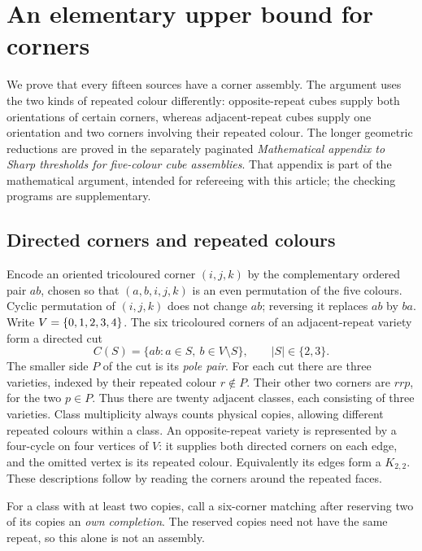 \section{An elementary upper bound for corners}\label{sec:elementary}
We prove that every fifteen sources have a corner assembly. The argument
uses the two kinds of repeated colour differently: opposite-repeat cubes
supply both orientations of certain corners, whereas adjacent-repeat cubes
supply one orientation and two corners involving their repeated colour.
The longer geometric reductions are proved in the separately paginated
\emph{Mathematical appendix to Sharp thresholds for five-colour cube
assemblies}. That appendix is part of the mathematical argument, intended
for refereeing with this article; the checking programs are supplementary.

\subsection{Directed corners and repeated colours}
Encode an oriented tricoloured corner $(i,j,k)$ by the complementary ordered
pair $ab$, chosen so that $(a,b,i,j,k)$ is an even permutation of the five
colours. Cyclic permutation of $(i,j,k)$ does not change $ab$; reversing it
replaces $ab$ by $ba$. Write $V=\{0,1,2,3,4\}$.
The six tricoloured corners of an adjacent-repeat variety form a directed cut
\[
 C(S)=\{ab:a\in S,\ b\in V\setminus S\},\qquad |S|\in\{2,3\}.
\]
The smaller side $P$ of the cut is its \emph{pole pair}. For each cut there
are three varieties, indexed by their repeated colour $r\notin P$.
Their other two corners are $rrp$, for the two $p\in P$.
Thus there are twenty adjacent classes, each consisting of three varieties.
Class multiplicity always counts physical copies, allowing different
repeated colours within a class.
An opposite-repeat variety is represented by a four-cycle on four vertices
of $V$: it supplies both directed corners on each edge, and the omitted
vertex is its repeated colour. Equivalently its edges form a $K_{2,2}$.
These descriptions follow by reading the corners around the repeated faces.

For a class with at least two copies, call a six-corner matching after
reserving two of its copies an \emph{own completion}. The reserved copies
need not have the same repeat, so this alone is not an assembly.


